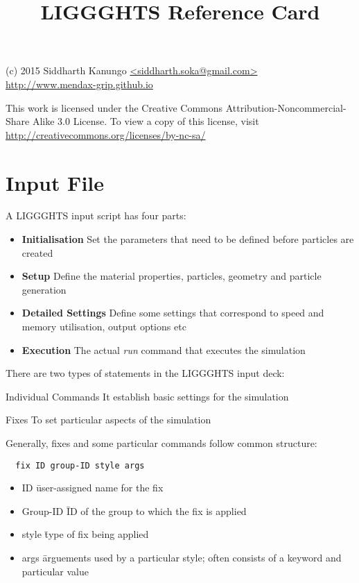 \message{ !name(Cheatsheet.tex)}\documentclass[8pt]{extarticle} %
\begin{document}

\raggedright

\begin{multicols}{3}

\title{LIGGGHTS Reference Card}

{\small
(c) 2015 Siddharth Kanungo \url{<siddharth.soka@gmail.com>}\\
\url{http://www.mendax-grip.github.io}

This work is licensed under the Creative Commons Attribution-Noncommercial-Share
Alike 3.0 License. To view a copy of this license, visit
\url{http://creativecommons.org/licenses/by-nc-sa/}
}

\vspace*{1pt}

\section{Input File}
A LIGGGHTS input script has four parts:
\begin{itemize}
\item \textbf{Initialisation}
  Set the parameters that need to be defined before particles are created
\item \textbf{Setup}
  Define the material properties, particles, geometry and particle generation
\item \textbf{Detailed Settings}
  Define some settings that correspond to speed and memory utilisation, output options etc
\item \textbf{Execution}
  The actual \textit{run} command that executes the simulation
\end{itemize}

There are two types of statements in the LIGGGHTS input deck:
\begin{list}{Type of Commands}{}
\item Individual Commands
  It establish basic settings for the simulation
\item Fixes
  To set particular aspects of the simulation
\end{list}

Generally, fixes and some particular commands follow common structure:
\begin{verbatim}
  fix ID group-ID style args
\end{verbatim}
\begin{itemize}
\item ID \= user-assigned name for the fix
\item Group-ID \= ID of the group to which the fix is applied
\item style \= type of fix being applied
\item args \= arguements used by a particular style; often consists of a keyword and particular value
\end{itemize}
\vspace{1ex}


\end{multicols}
\end{document}
